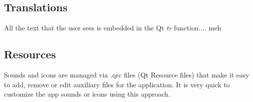 \documentclass[titlepage]{article}
\begin{document}
	\subsection{Translations}
	All the text that the user sees is embedded in the Qt \textit{tr} function.... meh
	\subsection{Resources}
	Sounds and icons are managed via .qrc files (Qt Resource files) that make it easy to add, remove or edit auxiliary files for the application. It is very quick to customize the app sounds or icons using this approach.
\end{document}
